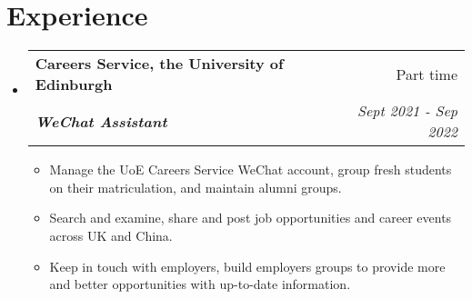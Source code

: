 \documentclass[12pt, a4paper]{article}
\makeatletter
\newcommand{\resumeSection}[1]{
    \section*{#1}
}
\newcommand{\resumeSectionItm}[4]{
\item
    \begin{tabular*}{0.96\textwidth}{@{}l@{\extracolsep{\fill}}r@{}}
        \textbf{#1} & #2 \\
        \textit{\textbf{#3}} & \textit{#4}
    \end{tabular*}
}
\newcommand{\resumeSectionSubItmI}[1]{
\item {#1}\vspace{-2mm}
}
\makeatother
\begin{document}
\resumeSection{Experience}
\begin{itemize}[leftmargin=*]
    \resumeSectionItm
    {Careers Service, the University of Edinburgh}{Part time}
    {WeChat Assistant}{Sept 2021 - Sep 2022}
    \vspace{-2mm}
    \begin{itemize}[leftmargin=*]
        \resumeSectionSubItmI{Manage the UoE Careers Service WeChat account,
            group fresh students on their matriculation, and maintain alumni
        groups.}
        \resumeSectionSubItmI{Search and examine, share and post job
        opportunities and career events across UK and China.}
        \resumeSectionSubItmI{Keep in touch with employers, build employers
            groups to provide more and better opportunities with up-to-date
        information.}
    \end{itemize}
\end{itemize}
\vspace{-2mm}
\end{document}
